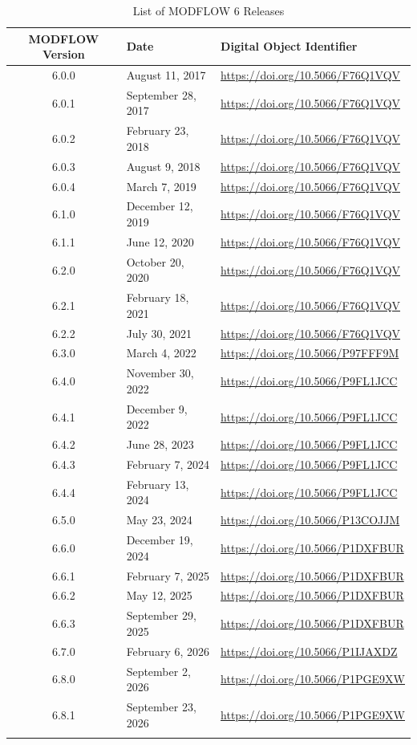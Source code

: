 \documentclass[11pt,twoside,twocolumn]{usgsreport}
\begin{document}
\begin{table}[h]
\begin{center}
\caption{List of MODFLOW 6 Releases}
\small 
\begin{tabular*}{13cm}{cll}
\hline
\hline
\textbf{MODFLOW Version} & \textbf{Date} & \textbf{Digital Object Identifier}\\
\hline
6.0.0 & August 11, 2017 & \url{https://doi.org/10.5066/F76Q1VQV} \\
6.0.1 & September 28, 2017 & \url{https://doi.org/10.5066/F76Q1VQV} \\
6.0.2 & February 23, 2018 & \url{https://doi.org/10.5066/F76Q1VQV} \\
6.0.3 & August 9, 2018 & \url{https://doi.org/10.5066/F76Q1VQV} \\
6.0.4 & March 7, 2019 & \url{https://doi.org/10.5066/F76Q1VQV} \\
6.1.0 & December 12, 2019 & \url{https://doi.org/10.5066/F76Q1VQV} \\
6.1.1 & June 12, 2020 & \url{https://doi.org/10.5066/F76Q1VQV} \\
6.2.0 & October 20, 2020 & \url{https://doi.org/10.5066/F76Q1VQV} \\
6.2.1 & February 18, 2021 & \url{https://doi.org/10.5066/F76Q1VQV} \\
6.2.2 & July 30, 2021 & \url{https://doi.org/10.5066/F76Q1VQV} \\
6.3.0 & March 4, 2022 & \url{https://doi.org/10.5066/P97FFF9M} \\
6.4.0 & November 30, 2022 & \url{https://doi.org/10.5066/P9FL1JCC} \\
6.4.1 & December 9, 2022 & \url{https://doi.org/10.5066/P9FL1JCC} \\
6.4.2 & June 28, 2023 & \url{https://doi.org/10.5066/P9FL1JCC} \\
6.4.3 & February 7, 2024 & \url{https://doi.org/10.5066/P9FL1JCC} \\
6.4.4 & February 13, 2024 & \url{https://doi.org/10.5066/P9FL1JCC} \\
6.5.0 & May 23, 2024 & \url{https://doi.org/10.5066/P13COJJM} \\
6.6.0 & December 19, 2024 & \url{https://doi.org/10.5066/P1DXFBUR} \\
6.6.1 & February 7, 2025 & \url{https://doi.org/10.5066/P1DXFBUR} \\
6.6.2 & May 12, 2025 & \url{https://doi.org/10.5066/P1DXFBUR} \\
6.6.3 & September 29, 2025 & \url{https://doi.org/10.5066/P1DXFBUR} \\
6.7.0 & February 6, 2026 & \url{https://doi.org/10.5066/P1IJAXDZ} \\
6.8.0 & September 2, 2026 & \url{https://doi.org/10.5066/P1PGE9XW} \\
6.8.1 & September 23, 2026 & \url{https://doi.org/10.5066/P1PGE9XW} \\
\hline
\label{tab:releases}
\end{tabular*}
\end{center}
\normalsize
\end{table}
\end{document}
